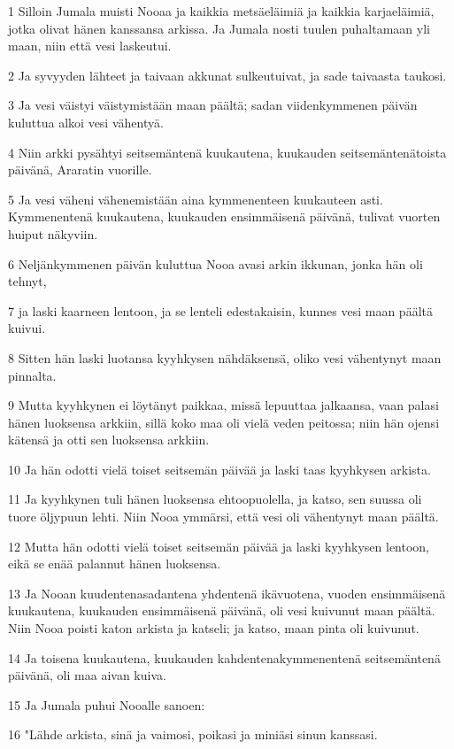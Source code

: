 \par 1 Silloin Jumala muisti Nooaa ja kaikkia metsäeläimiä ja kaikkia karjaeläimiä, jotka olivat hänen kanssansa arkissa. Ja Jumala nosti tuulen puhaltamaan yli maan, niin että vesi laskeutui.
\par 2 Ja syvyyden lähteet ja taivaan akkunat sulkeutuivat, ja sade taivaasta taukosi.
\par 3 Ja vesi väistyi väistymistään maan päältä; sadan viidenkymmenen päivän kuluttua alkoi vesi vähentyä.
\par 4 Niin arkki pysähtyi seitsemäntenä kuukautena, kuukauden seitsemäntenätoista päivänä, Araratin vuorille.
\par 5 Ja vesi väheni vähenemistään aina kymmenenteen kuukauteen asti. Kymmenentenä kuukautena, kuukauden ensimmäisenä päivänä, tulivat vuorten huiput näkyviin.
\par 6 Neljänkymmenen päivän kuluttua Nooa avasi arkin ikkunan, jonka hän oli tehnyt,
\par 7 ja laski kaarneen lentoon, ja se lenteli edestakaisin, kunnes vesi maan päältä kuivui.
\par 8 Sitten hän laski luotansa kyyhkysen nähdäksensä, oliko vesi vähentynyt maan pinnalta.
\par 9 Mutta kyyhkynen ei löytänyt paikkaa, missä lepuuttaa jalkaansa, vaan palasi hänen luoksensa arkkiin, sillä koko maa oli vielä veden peitossa; niin hän ojensi kätensä ja otti sen luoksensa arkkiin.
\par 10 Ja hän odotti vielä toiset seitsemän päivää ja laski taas kyyhkysen arkista.
\par 11 Ja kyyhkynen tuli hänen luoksensa ehtoopuolella, ja katso, sen suussa oli tuore öljypuun lehti. Niin Nooa ymmärsi, että vesi oli vähentynyt maan päältä.
\par 12 Mutta hän odotti vielä toiset seitsemän päivää ja laski kyyhkysen lentoon, eikä se enää palannut hänen luoksensa.
\par 13 Ja Nooan kuudentenasadantena yhdentenä ikävuotena, vuoden ensimmäisenä kuukautena, kuukauden ensimmäisenä päivänä, oli vesi kuivunut maan päältä. Niin Nooa poisti katon arkista ja katseli; ja katso, maan pinta oli kuivunut.
\par 14 Ja toisena kuukautena, kuukauden kahdentenakymmenentenä seitsemäntenä päivänä, oli maa aivan kuiva.
\par 15 Ja Jumala puhui Nooalle sanoen:
\par 16 "Lähde arkista, sinä ja vaimosi, poikasi ja miniäsi sinun kanssasi.
